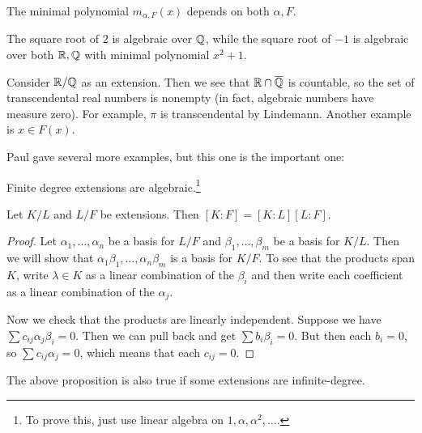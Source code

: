 \documentclass[10pt, twoside]{article}
\begin{document}
    \begin{rmk}
        The minimal polynomial $m_{\alpha,F}(x)$ depends on both $\alpha,F$.
    \end{rmk}

    \begin{exm}
        The square root of $2$ is algebraic over $\mathbb{Q}$, while the square root of $-1$ is algebraic over both $\mathbb{R},\mathbb{Q}$ with minimal polynomial $x^2+1$.
    \end{exm}
    
    \begin{rmk}
        Consider $\mathbb{R}/\mathbb{Q}$ as an extension. Then we see that $\mathbb{R} \cap \overline{\mathbb{Q}}$ is countable, so the set of transcendental real numbers is nonempty (in fact, algebraic numbers have measure zero). For example, $\pi$ is transcendental by Lindemann. Another example is $x \in F(x)$.
    \end{rmk}

    Paul gave several more examples, but this one is the important one:

    \begin{rmk}
        Finite degree extensions are algebraic.\footnote{To prove this, just use linear algebra on $1,\alpha,\alpha^2, \ldots$.}
    \end{rmk}

    \begin{prop}
        Let $K/L$ and $L/F$ be extensions. Then $[K:F] = [K:L][L:F]$. 
        \begin{proof}
            Let $\alpha_1, \ldots, \alpha_n$ be a basis for $L/F$ and $\beta_1, \ldots, \beta_m$ be a basis for $K/L$. Then we will show that $\alpha_1\beta_1, \ldots, \alpha_n\beta_m$ is a basis for $K/F$. To see that the products span $K$, write $\lambda \in K$ as a linear combination of the $\beta_i$ and then write each coefficient as a linear combination of the $\alpha_j$. 

            Now we check that the products are linearly independent. Suppose we have $\sum c_{ij}\alpha_j\beta_i = 0$. Then we can pull back and get $\sum b_i \beta_i = 0$. But then each $b_i = 0$, so $\sum c_{ij} \alpha_j = 0$, which means that each $c_{ij} = 0$.
        \end{proof}
    \end{prop}

    \begin{rmk}
        The above proposition is also true if some extensions are infinite-degree.
    \end{rmk}
\end{document}
